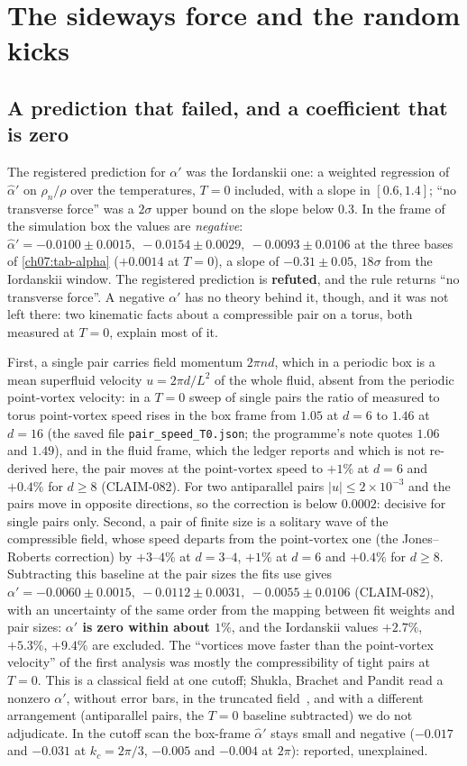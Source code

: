 \section{The sideways force and the random kicks}\label{ch07:alphaprime}

\subsection*{A prediction that failed, and a coefficient that is zero}

The registered prediction for $\alpha'$ was the Iordanskii one: a weighted regression of $\hat\alpha'$ on $\rho_n/\rho$ over the temperatures, $T=0$ included, with a slope in $[0.6,1.4]$; ``no transverse force'' was a $2\sigma$ upper bound on the slope below $0.3$. In the frame of the simulation box the values are
\emph{negative}: $\hat\alpha'=-0.0100\pm0.0015,\ -0.0154\pm0.0029,\ -0.0093\pm0.0106$ at the three bases of \cref{ch07:tab-alpha} ($+0.0014$ at $T=0$), a slope of $-0.31\pm0.05$, $18\sigma$ from the Iordanskii window. The registered prediction is \textbf{refuted}, and the rule returns ``no transverse force''.
A negative $\alpha'$ has no theory behind it, though, and it was not left there: two kinematic facts about a compressible pair on a torus, both measured at $T=0$, explain most of it.

First, a single pair carries field momentum $2\pi nd$, which in a periodic box is a mean superfluid velocity $u=2\pi d/L^2$ of the whole fluid, absent from the periodic point-vortex velocity: in a $T=0$ sweep of single pairs the ratio of measured to torus point-vortex speed rises in the box frame from $1.05$ at $d=6$ to $1.46$ at $d=16$ (the saved file \texttt{pair\_speed\_T0.json}; the programme's note quotes $1.06$ and $1.49$), and in the fluid frame, which the ledger reports and which is not re-derived here, the pair moves at the point-vortex speed to
$+1\%$ at $d=6$ and $+0.4\%$ for $d\ge8$ (CLAIM-082). For two antiparallel pairs $|u|\le2\times10^{-3}$ and the pairs move in opposite directions, so the correction is below $0.0002$: decisive for single pairs only. Second, a pair of finite size is a solitary wave of the compressible field, whose speed departs from the point-vortex one (the Jones--Roberts correction) by $+3$--$4\%$ at $d=3$--$4$,
$+1\%$ at $d=6$ and $+0.4\%$ for $d\ge8$. Subtracting this baseline at the pair sizes the fits use gives $\alpha'=-0.0060\pm0.0015,\ -0.0112\pm0.0031,\ -0.0055\pm0.0106$ (CLAIM-082), with an uncertainty of the same order from the mapping between fit weights and pair sizes: \textbf{$\alpha'$ is zero within about $1\%$}, and the Iordanskii values $+2.7\%$, $+5.3\%$, $+9.4\%$ are excluded. The
``vortices move faster than the point-vortex velocity'' of the first analysis was mostly the compressibility of tight pairs at $T=0$. This is a classical field at one cutoff; Shukla, Brachet and Pandit read a nonzero $\alpha'$, without error bars, in the truncated field~\cite{Shukla2014}, and with a different arrangement (antiparallel pairs, the $T=0$ baseline subtracted) we do not adjudicate. In the cutoff scan the box-frame $\hat\alpha'$ stays small and negative ($-0.017$ and
$-0.031$ at $k_c=2\pi/3$, $-0.005$ and $-0.004$ at $2\pi$): reported, unexplained.

